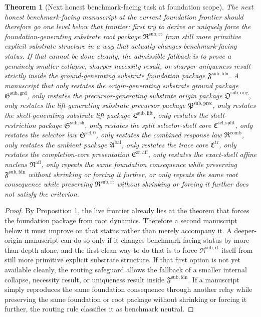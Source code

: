 \documentclass[11pt]{article}
\newcommand{\CompletionCore}{\mathfrak C^{\mathrm{zr,aff}}}
\newcommand{\TraceCore}{\mathfrak C^{\mathrm{tr}}}
\newcommand{\AffineNucleus}{\mathfrak N^{\mathrm{aff}}}
\newcommand{\AmbientPackage}{\mathfrak A^{\mathrm{bal}}}
\newcommand{\CombinedLaw}{\mathfrak R^{\mathrm{comb}}}
\newcommand{\SelectorLaw}{\mathfrak S^{\mathrm{sel},0}}
\newcommand{\SelectorCore}{\mathfrak C^{\mathrm{sel,split}}}
\newcommand{\ShellRestriction}{\mathfrak S^{\mathrm{sub,sh}}}
\newcommand{\LiftPackage}{\mathfrak L^{\mathrm{sub,lift}}}
\newcommand{\PrecursorPackage}{\mathfrak P^{\mathrm{sub,prec}}}
\newcommand{\OriginPackage}{\mathfrak O^{\mathrm{sub,orig}}}
\newcommand{\GroundPackage}{\mathfrak G^{\mathrm{sub,grd}}}
\newcommand{\FoundationPackage}{\mathfrak F^{\mathrm{sub,fdn}}}
\newcommand{\RootPackage}{\mathfrak R^{\mathrm{sub,rt}}}
\newtheorem{theorem}{Theorem}
\begin{document}
\begin{theorem}[Next honest benchmark-facing task at foundation scope]
The next honest benchmark-facing manuscript at the current foundation frontier should therefore go one level below that frontier: first try to derive or uniquely force the foundation-generating substrate root package \(\RootPackage\) from still more primitive explicit substrate structure in a way that actually changes benchmark-facing status. If that cannot be done cleanly, the admissible fallback is to prove a genuinely smaller collapse, sharper necessity result, or sharper uniqueness result strictly inside the ground-generating substrate foundation package \(\FoundationPackage\). A manuscript that only restates the origin-generating substrate ground package \(\GroundPackage\), only restates the precursor-generating substrate origin package \(\OriginPackage\), only restates the lift-generating substrate precursor package \(\PrecursorPackage\), only restates the shell-generating substrate lift package \(\LiftPackage\), only restates the shell-restriction package \(\ShellRestriction\), only restates the split selector-shell core \(\SelectorCore\), only restates the selector law \(\SelectorLaw\), only restates the combined response law \(\CombinedLaw\), only restates the ambient package \(\AmbientPackage\), only restates the trace core \(\TraceCore\), only restates the completion-core presentation \(\CompletionCore\), only restates the exact-shell affine nucleus \(\AffineNucleus\), only repeats the same foundation consequence while preserving \(\FoundationPackage\) without shrinking or forcing it further, or only repeats the same root consequence while preserving \(\RootPackage\) without shrinking or forcing it further does not satisfy the criterion.
\end{theorem}

\begin{proof}
By Proposition 1, the live frontier already lies at the theorem that forces the foundation package from root dynamics. Therefore a second manuscript below it must improve on that status rather than merely accompany it. A deeper-origin manuscript can do so only if it changes benchmark-facing status by more than depth alone, and the first clean way to do that is to force \(\RootPackage\) itself from still more primitive explicit substrate structure. If that first option is not yet available cleanly, the routing safeguard allows the fallback of a smaller internal collapse, necessity result, or uniqueness result inside \(\FoundationPackage\). If a manuscript simply reproduces the same foundation consequence through another relay while preserving the same foundation or root package without shrinking or forcing it further, the routing rule classifies it as benchmark neutral.
\end{proof}
\end{document}
